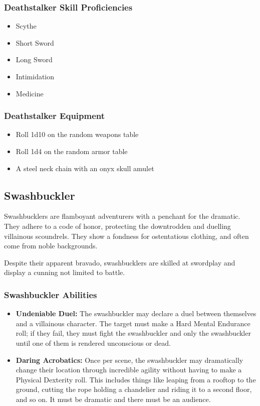 \begin{multicols}{2}
\subsubsection{Deathstalker Skill Proficiencies}

\begin{itemize}
  \item Scythe
  \item Short Sword
  \item Long Sword
  \item Intimidation
  \item Medicine
\end{itemize}

\subsubsection{Deathstalker Equipment}

\begin{itemize}
  \item Roll 1d10 on the random weapons table
  \item Roll 1d4 on the random armor table
  \item A steel neck chain with an onyx skull amulet
\end{itemize}

\subsection{Swashbuckler}

Swashbucklers are flamboyant adventurers with a penchant for the dramatic.
They adhere to a code of honor, protecting the downtrodden and duelling
villainous scoundrels. They show a fondness for ostentatious clothing, and
often come from noble backgrounds.

Despite their apparent bravado, swashbucklers are skilled at swordplay and
display a cunning not limited to battle.

\subsubsection{Swashbuckler Abilities}

\begin{itemize}
  \item \textbf{Undeniable Duel:} The swashbuckler may declare a duel between
    themselves and a villainous character. The target must make a Hard Mental
    Endurance roll; if they fail, they must fight the swashbuckler and only the
    swashbuckler until one of them is rendered unconscious or dead.
  \item \textbf{Daring Acrobatics:} Once per scene, the swashbuckler may
    dramatically change their location through incredible agility without having
    to make a Physical Dexterity roll. This includes things like leaping from a
    rooftop to the ground, cutting the rope holding a chandelier and riding it to
    a second floor, and so on. It must be dramatic and there must be an audience.
\end{itemize}


\end{multicols}
